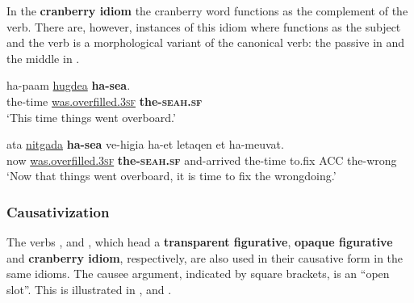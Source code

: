\documentclass[output=paper]{langsci/langscibook}
\begin{document}

In the \textbf{cranberry idiom}  the cranberry word  functions as the complement of the verb.  There are, however, instances of this idiom where  functions as the subject and the verb is a morphological variant of the canonical verb: the passive  in  and the middle  in .

    \ea\label{sea-passive}
         \gll ha-pa{\ayin}am \underline{hugde{\shin}a} \textbf{ha-se{\alef}a}.\\
             the-time \underline{was.overfilled.\textsc{3sf}} \textbf{the-\textsc{seah}.\textsc{sf}}\\
         \glt `This time things went overboard.'
    \z

	\ea\label{sea-arg-rev}
    	\gll {\ayin}ata \underline{nitgad{\shin}a} \textbf{ha-se{\alef}a} ve-higi{\ayin}a ha-{\ayin}et letaqen {\alef}et ha-me{\ayin}uvat.\\
    	   now \underline{was.overfilled.\textsc{3sf}} \textbf{the-\textsc{seah}.\textsc{sf}} and-arrived the-time to.fix ACC the-wrong\\
    	\glt `Now that things went overboard, it is time to fix the wrongdoing.'
	\z

\subsubsection{Causativization}
\label{sec:causativization}

The verbs ,  and  , which head a \textbf{transparent figurative}, \textbf{opaque figurative} and \textbf{cranberry idiom}, respectively, are also used in their causative form in the same idioms. The causee argument, indicated by square brackets, is an ``open slot''. This is illustrated in ,  and .
\end{document}

